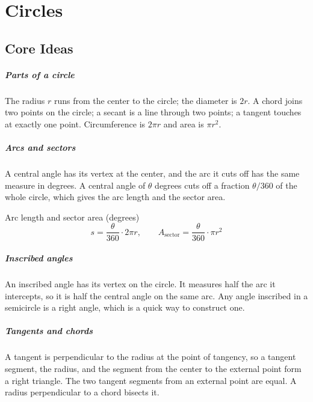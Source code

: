 \chapter{Circles}


\section{Core Ideas}

\paragraph{Parts of a circle} The radius $r$ runs from the center to the circle; the diameter is $2r$. A chord joins two points on the circle; a secant is a line through two points; a tangent touches at exactly one point. Circumference is $2\pi r$ and area is $\pi r^2$.

\paragraph{Arcs and sectors} A central angle has its vertex at the center, and the arc it cuts off has the same measure in degrees. A central angle of $\theta$ degrees cuts off a fraction $\theta/360$ of the whole circle, which gives the arc length and the sector area.

\begin{keybox}{Arc length and sector area (degrees)}
\[
s = \frac{\theta}{360} \cdot 2\pi r, \qquad A_{\text{sector}} = \frac{\theta}{360} \cdot \pi r^2
\]
\end{keybox}

\paragraph{Inscribed angles} An inscribed angle has its vertex on the circle. It measures half the arc it intercepts, so it is half the central angle on the same arc. Any angle inscribed in a semicircle is a right angle, which is a quick way to construct one.

\paragraph{Tangents and chords} A tangent is perpendicular to the radius at the point of tangency, so a tangent segment, the radius, and the segment from the center to the external point form a right triangle. The two tangent segments from an external point are equal. A radius perpendicular to a chord bisects it.

